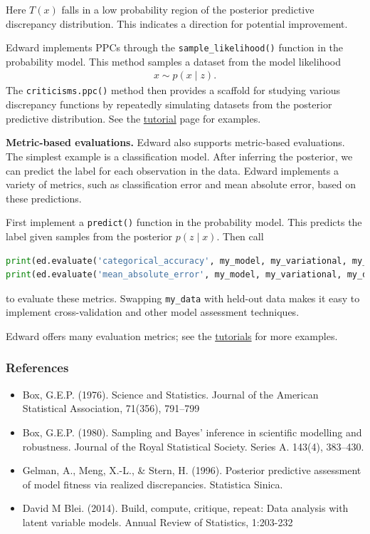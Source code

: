 Here $T(x)$ falls in a low probability region of the posterior
predictive discrepancy distribution. This indicates a direction for potential
improvement.

Edward implements PPCs through the \texttt{sample_likelihood()}
function in the probability model. This method samples a dataset from the
model likelihood
\begin{align*}
  x \sim p(x \mid z).
\end{align*}
The \texttt{criticisms.ppc()} method then provides a scaffold for studying various
discrepancy functions by repeatedly simulating datasets from the posterior
predictive distribution. See the \href{tutorials.html}{tutorial} page for
examples.

\textbf{Metric-based evaluations.} 
Edward also supports metric-based evaluations. The simplest example is 
a classification model. After inferring the posterior, we can predict the
label for each observation in the data. Edward implements a
variety of metrics, such as classification error and mean absolute error, based
on these predictions.

First implement a \texttt{predict()} function in the probability model. This
predicts the label given samples from the posterior $p(z \mid x)$. Then call
\begin{lstlisting}[language=Python]
print(ed.evaluate('categorical_accuracy', my_model, my_variational, my_data))
print(ed.evaluate('mean_absolute_error', my_model, my_variational, my_data))
\end{lstlisting}
to evaluate these metrics. Swapping \texttt{my_data} with held-out data makes it
easy to implement cross-validation and other model assessment techniques.

Edward offers many evaluation metrics; see the  
\href{tutorials.html}{tutorials} for more examples.

\subsubsection{References}\label{references}

\begin{itemize}
\item 
  Box, G.E.P. (1976). Science and Statistics. Journal of the American
  Statistical Association, 71(356), 791–799
\item
  Box, G.E.P. (1980). Sampling and Bayes' inference in scientific modelling and
  robustness. Journal of the Royal Statistical Society. Series A. 143(4), 383–430.
\item 
  Gelman, A., Meng, X.-L., \& Stern, H. (1996). Posterior predictive assessment
  of model fitness via realized discrepancies. Statistica Sinica.
\item
  David M Blei. (2014). Build, compute, critique, repeat: Data analysis with
  latent variable models. Annual Review of Statistics, 1:203-232
\end{itemize}
